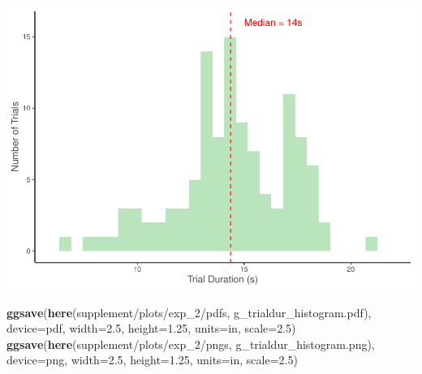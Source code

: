 \documentclass[
  doc,floatsintext]{apa6}
\newenvironment{Shaded}{\begin{snugshade}}{\end{snugshade}}
\newcommand{\AttributeTok}[1]{\textcolor[rgb]{0.13,0.29,0.53}{#1}}
\newcommand{\FloatTok}[1]{\textcolor[rgb]{0.00,0.00,0.81}{#1}}
\newcommand{\FunctionTok}[1]{\textcolor[rgb]{0.13,0.29,0.53}{\textbf{#1}}}
\newcommand{\NormalTok}[1]{#1}
\newcommand{\StringTok}[1]{\textcolor[rgb]{0.31,0.60,0.02}{#1}}
\begin{document}
\includegraphics{revised_ms_analyses_files/figure-latex/r2-g-durations-trial-1.pdf}

\begin{Shaded}
\begin{Highlighting}[]
\FunctionTok{ggsave}\NormalTok{(}\FunctionTok{here}\NormalTok{(}\StringTok{\textquotesingle{}supplement/plots/exp\_2/pdfs\textquotesingle{}}\NormalTok{, }\StringTok{\textquotesingle{}g\_trialdur\_histogram.pdf\textquotesingle{}}\NormalTok{), }
       \AttributeTok{device=}\StringTok{\textquotesingle{}pdf\textquotesingle{}}\NormalTok{, }\AttributeTok{width=}\FloatTok{2.5}\NormalTok{, }\AttributeTok{height=}\FloatTok{1.25}\NormalTok{, }\AttributeTok{units=}\StringTok{\textquotesingle{}in\textquotesingle{}}\NormalTok{, }\AttributeTok{scale=}\FloatTok{2.5}\NormalTok{)}
\FunctionTok{ggsave}\NormalTok{(}\FunctionTok{here}\NormalTok{(}\StringTok{\textquotesingle{}supplement/plots/exp\_2/pngs\textquotesingle{}}\NormalTok{, }\StringTok{\textquotesingle{}g\_trialdur\_histogram.png\textquotesingle{}}\NormalTok{),}
       \AttributeTok{device=}\StringTok{\textquotesingle{}png\textquotesingle{}}\NormalTok{, }\AttributeTok{width=}\FloatTok{2.5}\NormalTok{, }\AttributeTok{height=}\FloatTok{1.25}\NormalTok{, }\AttributeTok{units=}\StringTok{\textquotesingle{}in\textquotesingle{}}\NormalTok{, }\AttributeTok{scale=}\FloatTok{2.5}\NormalTok{)}
\end{Highlighting}
\end{Shaded}
\end{document}
